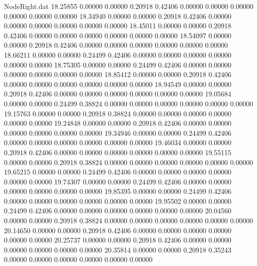 \begin{filecontents}{NodeRight.dat}
  18.25855    0.00000    0.00000     0.20918    0.42406    0.00000    0.00000    0.00000    0.00000    0.00000    0.00000
  18.34940    0.00000    0.00000     0.20918    0.42406    0.00000    0.00000    0.00000    0.00000    0.00000    0.00000
  18.45011    0.00000    0.00000     0.20918    0.42406    0.00000    0.00000    0.00000    0.00000    0.00000    0.00000
  18.54097    0.00000    0.00000     0.20918    0.42406    0.00000    0.00000    0.00000    0.00000    0.00000    0.00000
  18.66211    0.00000    0.00000     0.24499    0.42406    0.00000    0.00000    0.00000    0.00000    0.00000    0.00000
  18.75305    0.00000    0.00000     0.24499    0.42406    0.00000    0.00000    0.00000    0.00000    0.00000    0.00000
  18.85412    0.00000    0.00000     0.20918    0.42406    0.00000    0.00000    0.00000    0.00000    0.00000    0.00000
  18.94549    0.00000    0.00000     0.20918    0.42406    0.00000    0.00000    0.00000    0.00000    0.00000    0.00000
  19.05684    0.00000    0.00000     0.24499    0.38824    0.00000    0.00000    0.00000    0.00000    0.00000    0.00000
  19.15763    0.00000    0.00000     0.20918    0.38824    0.00000    0.00000    0.00000    0.00000    0.00000    0.00000
  19.24848    0.00000    0.00000     0.20918    0.42406    0.00000    0.00000    0.00000    0.00000    0.00000    0.00000
  19.34946    0.00000    0.00000     0.24499    0.42406    0.00000    0.00000    0.00000    0.00000    0.00000    0.00000
  19.46034    0.00000    0.00000     0.20918    0.42406    0.00000    0.00000    0.00000    0.00000    0.00000    0.00000
  19.55115    0.00000    0.00000     0.20918    0.38824    0.00000    0.00000    0.00000    0.00000    0.00000    0.00000
  19.65215    0.00000    0.00000     0.24499    0.42406    0.00000    0.00000    0.00000    0.00000    0.00000    0.00000
  19.74307    0.00000    0.00000     0.24499    0.42406    0.00000    0.00000    0.00000    0.00000    0.00000    0.00000
  19.85395    0.00000    0.00000     0.24499    0.42406    0.00000    0.00000    0.00000    0.00000    0.00000    0.00000
  19.95502    0.00000    0.00000     0.24499    0.42406    0.00000    0.00000    0.00000    0.00000    0.00000    0.00000
  20.04560    0.00000    0.00000     0.20918    0.38824    0.00000    0.00000    0.00000    0.00000    0.00000    0.00000
  20.14650    0.00000    0.00000     0.20918    0.42406    0.00000    0.00000    0.00000    0.00000    0.00000    0.00000
  20.25737    0.00000    0.00000     0.20918    0.42406    0.00000    0.00000    0.00000    0.00000    0.00000    0.00000
  20.35814    0.00000    0.00000     0.20918    0.35243    0.00000    0.00000    0.00000    0.00000    0.00000    0.00000

\end{filecontents}
